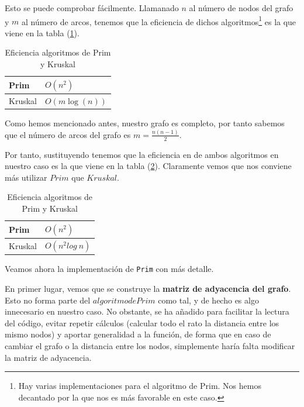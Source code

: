 \documentclass{article}
\begin{document}
Esto se puede comprobar fácilmente. Llamanado $n$ al número de nodos del grafo y $m$ al número de arcos, tenemos que la eficiencia de dichos algoritmos\footnote{Hay varias implementaciones para el algoritmo de Prim. Nos hemos decantado por la que nos es más favorable en este caso.} es la que viene en la tabla (\ref{tab:cmp_prim_kruskal}).
\newline
\begin{table}[!hbt]
    \centering
    \begin{tabular}{|l|l|}
        \hline
        Prim & $O(n^{2})$ \\
        \hline
        Kruskal & $O(m \log (n))$ \\
        \hline
    \end{tabular}
    \caption{Eficiencia algoritmos de Prim y Kruskal}
    \label{tab:cmp_prim_kruskal}
\end{table}

Como hemos mencionado antes, nuestro grafo es completo, por tanto sabemos que el número de arcos del grafo es $m = \frac{n(n-1)}{2}$. 
\newline

Por tanto, sustituyendo tenemos que la eficiencia en de ambos algoritmos en nuestro caso es la que viene en la tabla (\ref{tab:cmp_prim_kruskal2}). Claramente vemos que nos conviene más utilizar $Prim$ que $Kruskal$.
\newline
\begin{table}[!hbt]
    \centering
    \begin{tabular}{|l|l|}
        \hline
        Prim & $O(n^{2})$ \\
        \hline
        Kruskal & $O(n^{2}log\:n)$ \\
        \hline
    \end{tabular}
    \caption{Eficiencia algoritmos de Prim y Kruskal}
    \label{tab:cmp_prim_kruskal2}
\end{table}
\newline

Veamos ahora la implementación de \verb|Prim| con más detalle.


En primer lugar, vemos que se construye la \textbf{matriz de adyacencia del grafo}. Esto no forma parte del $algoritmo de Prim$ como tal, y de hecho es algo innecesario en nuestro caso. No obstante, se ha añadido para facilitar la lectura del código, evitar repetir cálculos (calcular todo el rato la distancia entre los mismo nodos) y aportar generalidad a la función, de forma que en caso de cambiar el grafo o la distancia entre los nodos, simplemente haría falta modificar la matriz de adyacencia.
\end{document}

